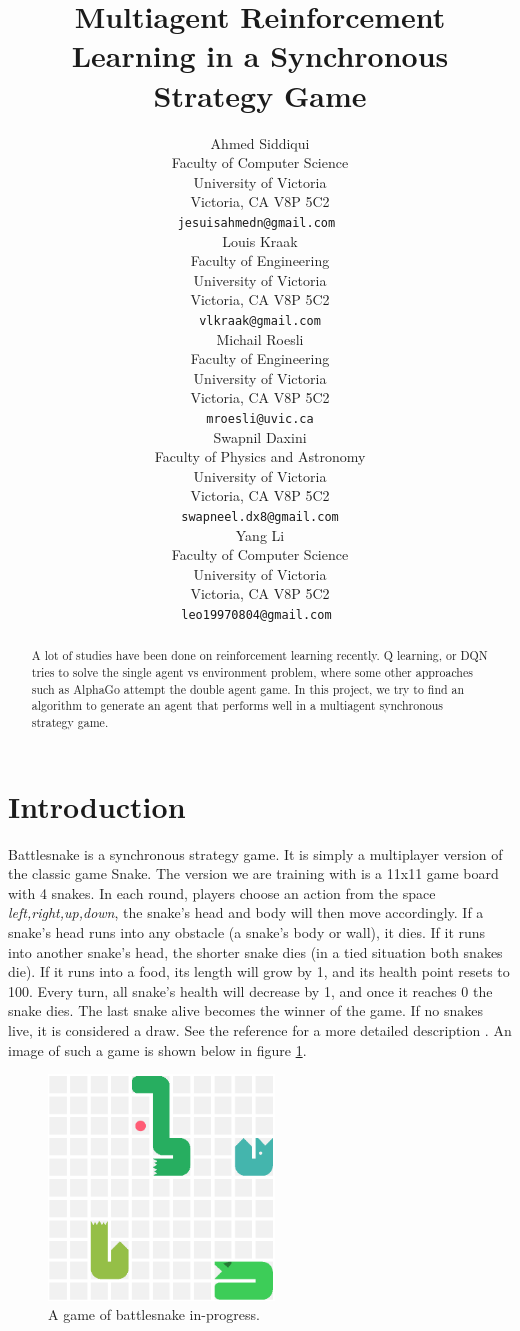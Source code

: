 \documentclass{article}
\title{Multiagent Reinforcement Learning in a Synchronous Strategy Game}
\author{%
  Ahmed Siddiqui \\
  Faculty of Computer Science\\
  University of Victoria\\
  Victoria, CA V8P 5C2 \\
  \texttt{jesuisahmedn@gmail.com } \\
  \And
  Louis Kraak  \\
  Faculty of Engineering \\
  University of Victoria \\
  Victoria, CA V8P 5C2 \\
  \texttt{vlkraak@gmail.com} \\
  \And
  Michail Roesli  \\
  Faculty of Engineering \\
  University of Victoria \\
  Victoria, CA V8P 5C2 \\
  \texttt{mroesli@uvic.ca} \\
  \And
  Swapnil Daxini  \\
  Faculty of Physics and Astronomy \\
  University of Victoria \\
  Victoria, CA V8P 5C2 \\
  \texttt{swapneel.dx8@gmail.com} \\
  \And
  Yang Li  \\
  Faculty of Computer Science \\
  University of Victoria \\
  Victoria, CA V8P 5C2 \\
  \texttt{leo19970804@gmail.com } \\
}
\begin{document}
\maketitle

\begin{abstract}
  A lot of studies have been done on reinforcement learning recently. Q
  learning, or DQN tries to solve the single agent vs environment problem, where
  some other approaches such as AlphaGo attempt the double agent game. In this
  project, we try to find an algorithm to generate an agent that performs well
  in a multiagent synchronous strategy game.
\end{abstract}

\section{Introduction}

Battlesnake is a synchronous strategy game. It is simply a multiplayer version
of the classic game Snake. The version we are training with is a 11x11 game
board with 4 snakes. In each round, players choose an action from the space
\textit{left,right,up,down}, the snake’s head and body will then move accordingly. If
a snake’s head runs into any obstacle (a snake’s body or wall), it dies. If it
runs into another snake’s head, the shorter snake dies (in a tied situation both
snakes die). If it runs into a food, its length will grow by 1, and its health
point resets to 100. Every turn, all snake’s health will decrease by 1, and once
it reaches 0 the snake dies. The last snake alive becomes the winner of the
game. If no snakes live, it is considered a draw. See the reference for a more
detailed description \cite{BattlesnakeDoc}. An image of such a game is shown
below in figure \ref{fig:snake}.


\begin{figure}[!ht]
  \centering
  \includegraphics[width=6cm]{snake}
  \caption{A game of battlesnake in-progress.}
  \label{fig:snake}
\end{figure}
\end{document}
